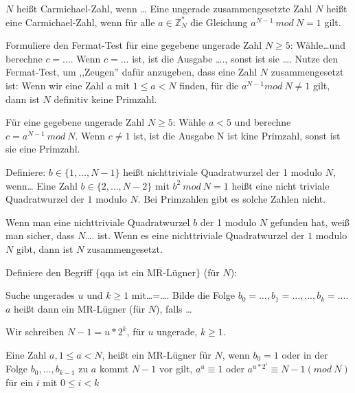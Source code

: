 \documentclass[avery5371, frame]{flashcards}
\begin{document}
\begin{flashcard}[Primzahlen]{$N$ heißt Carmichael-Zahl, wenn \dots}
    Eine ungerade zusammengesetzte Zahl $N$ heißt eine Carmichael-Zahl, wenn für alle $a\in\mathbb{Z}^*_N$ die Gleichung $a^{N-1}\ mod\ N= 1$ gilt.
\end{flashcard}

\begin{flashcard}[Primzahlen]{Formuliere den Fermat-Test für eine gegebene ungerade Zahl $N\geq 5$: Wähle\dots und berechne $c=\dots$. Wenn $c=\dots$ ist, ist die Ausgabe \dots., sonst ist sie \dots .}
    Nutze den Fermat-Test, um ,,Zeugen'' dafür anzugeben, dass eine Zahl $N$ zusammengesetzt ist: Wenn wir eine Zahl $a$ mit $1\leq a < N$ finden, für die $a^{N-1} mod\ N\not=1$ gilt, dann ist $N$ definitiv keine Primzahl.

    Für eine gegebene ungerade Zahl $N\geq 5$: Wähle $a<5$ und berechne $c=a^{N-1}\ mod\ N$. Wenn $c\not=1$ ist, ist die Ausgabe N ist kine Primzahl, sonst ist sie eine Primzahl.
\end{flashcard}

\begin{flashcard}[Primzahlen]{Definiere: $b\in\{1,\dots,N-1\}$ heißt nichttriviale Quadratwurzel der 1 modulo $N$, wenn\dots}
    Eine Zahl $b\in\{2,\dots,N-2\}$ mit $b^2\ mod\ N=1$ heißt eine nicht triviale Quadratwurzel der $1$ modulo $N$. Bei Primzahlen gibt es solche Zahlen nicht.
\end{flashcard}

\begin{flashcard}[Primzahlen]{Wenn man eine nichttriviale Quadratwurzel $b$ der 1 modulo $N$ gefunden hat, weiß man sicher, dass $N$\dots. ist.}
    Wenn es eine nichttriviale Quadratwurzel der $1$ modulo $N$ gibt, dann ist $N$ zusammengesetzt.
\end{flashcard}

\begin{flashcard}[Primzahlen]{Definiere den Begriff $\{$qqa ist ein MR-Lügner$\}$ (für $N$):

        Suche ungerades $u$ und $k\geq 1$ mit\dots=\dots .
        Bilde die Folge $b_0=\dots,b_1=\dots,\dots,b_k=\dots$.
        $a$ heißt dann ein MR-Lügner (für $N$), falls \dots}

    Wir schreiben $N-1=u*2^k$, für $u$ ungerade, $k\geq 1$.

    Eine Zahl $a, 1\leq a < N$, heißt ein MR-Lügner für $N$, wenn $b_0=1$ oder in der Folge $b_0,\dots,b_{k-1}$ zu $a$ kommt $N-1$ vor gilt, $a^u\equiv 1$ oder $a^{u*2^i}\equiv N-1 (mod\ N)$ für ein $i$ mit $0\leq i < k$
\end{flashcard}
\end{document}
